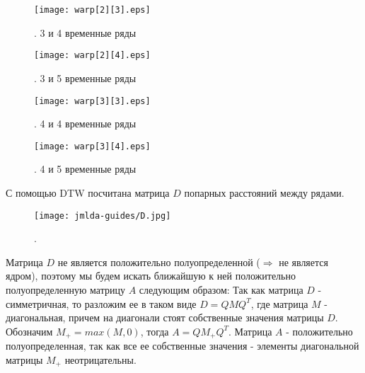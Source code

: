 \documentclass[12pt, twoside]{article}
\begin{document}
\begin{figure}[H]
\centering
\begin{minipage}{0.66\textwidth}
\texttt{[image: warp[2][3].eps]}
\end{minipage}%
\caption{ . 3 и 4 временные ряды}
\label{fig:2}
\end{figure}

\begin{figure}[H]
\centering
\begin{minipage}{0.66\textwidth}
\texttt{[image: warp[2][4].eps]}
\end{minipage}%
\caption{ . 3 и 5 временные ряды}
\label{fig:2}
\end{figure}

\begin{figure}[H]
\centering
\begin{minipage}{0.66\textwidth}
\texttt{[image: warp[3][3].eps]}
\end{minipage}%
\caption{ . 4 и 4 временные ряды}
\label{fig:2}
\end{figure}

\begin{figure}[H]
\centering
\begin{minipage}{0.66\textwidth}
\texttt{[image: warp[3][4].eps]}
\end{minipage}%
\caption{ . 4 и 5 временные ряды}
\label{fig:2}
\end{figure}


С помощью DTW посчитана матрица $D$ попарных расстояний между рядами.\\


\begin{figure}[H]
\centering
\begin{minipage}{0.76\textwidth}
\texttt{[image: jmlda-guides/D.jpg]}
\end{minipage}%
\caption{ .}
\label{fig:2}
\end{figure}




Матрица $D$ не является положительно полуопределенной ($\Rightarrow$ не является ядром), поэтому мы будем искать ближайшую к ней положительно полуопределенную матрицу $A$ следующим образом:
Так как матрица $D$ - симметричная, то разложим ее в таком виде $D = QMQ^T$, где матрица $M$ - диагональная, причем на диагонали стоят собственные значения матрицы $D$. Обозначим $M_{+} = max(M, 0)$, тогда $A = QM_{+}Q^T$. Матрица $A$ - положительно полуопределенная, так как все ее собственные значения - элементы диагональной матрицы $M_{+}$ неотрицательны.
\\
\end{document}
